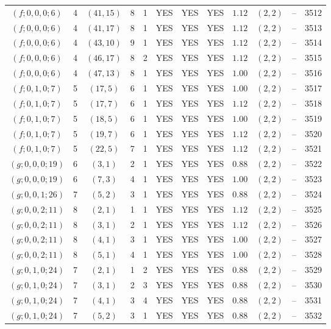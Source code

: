 \begin{longtable}{|c|c|c|c|c|c|c|c|c|c|c|c|}
$(f;0,0,0;6)$ & 4 & $(41,15)$ & 8 & 1 & YES & YES & YES & $1.12$ & $(2,2)$ & -- & 3512\\
$(f;0,0,0;6)$ & 4 & $(41,17)$ & 8 & 1 & YES & YES & YES & $1.12$ & $(2,2)$ & -- & 3513\\
$(f;0,0,0;6)$ & 4 & $(43,10)$ & 9 & 1 & YES & YES & YES & $1.12$ & $(2,2)$ & -- & 3514\\
$(f;0,0,0;6)$ & 4 & $(46,17)$ & 8 & 2 & YES & YES & YES & $1.12$ & $(2,2)$ & -- & 3515\\
$(f;0,0,0;6)$ & 4 & $(47,13)$ & 8 & 1 & YES & YES & YES & $1.00$ & $(2,2)$ & -- & 3516\\
$(f;0,1,0;7)$ & 5 & $(17,5)$ & 6 & 1 & YES & YES & YES & $1.00$ & $(2,2)$ & -- & 3517\\
$(f;0,1,0;7)$ & 5 & $(17,7)$ & 6 & 1 & YES & YES & YES & $1.12$ & $(2,2)$ & -- & 3518\\
$(f;0,1,0;7)$ & 5 & $(18,5)$ & 6 & 1 & YES & YES & YES & $1.00$ & $(2,2)$ & -- & 3519\\
$(f;0,1,0;7)$ & 5 & $(19,7)$ & 6 & 1 & YES & YES & YES & $1.12$ & $(2,2)$ & -- & 3520\\
$(f;0,1,0;7)$ & 5 & $(22,5)$ & 7 & 1 & YES & YES & YES & $1.12$ & $(2,2)$ & -- & 3521\\
$(g;0,0,0;19)$ & 6 & $(3,1)$ & 2 & 1 & YES & YES & YES & $0.88$ & $(2,2)$ & -- & 3522\\
$(g;0,0,0;19)$ & 6 & $(7,3)$ & 4 & 1 & YES & YES & YES & $1.00$ & $(2,2)$ & -- & 3523\\
$(g;0,0,1;26)$ & 7 & $(5,2)$ & 3 & 1 & YES & YES & YES & $0.88$ & $(2,2)$ & -- & 3524\\
$(g;0,0,2;11)$ & 8 & $(2,1)$ & 1 & 1 & YES & YES & YES & $1.12$ & $(2,2)$ & -- & 3525\\
$(g;0,0,2;11)$ & 8 & $(3,1)$ & 2 & 1 & YES & YES & YES & $1.12$ & $(2,2)$ & -- & 3526\\
$(g;0,0,2;11)$ & 8 & $(4,1)$ & 3 & 1 & YES & YES & YES & $1.00$ & $(2,2)$ & -- & 3527\\
$(g;0,0,2;11)$ & 8 & $(5,1)$ & 4 & 1 & YES & YES & YES & $1.00$ & $(2,2)$ & -- & 3528\\
$(g;0,1,0;24)$ & 7 & $(2,1)$ & 1 & 2 & YES & YES & YES & $0.88$ & $(2,2)$ & -- & 3529\\
$(g;0,1,0;24)$ & 7 & $(3,1)$ & 2 & 3 & YES & YES & YES & $0.88$ & $(2,2)$ & -- & 3530\\
$(g;0,1,0;24)$ & 7 & $(4,1)$ & 3 & 4 & YES & YES & YES & $0.88$ & $(2,2)$ & -- & 3531\\
$(g;0,1,0;24)$ & 7 & $(5,2)$ & 3 & 1 & YES & YES & YES & $0.88$ & $(2,2)$ & -- & 3532\\

\end{longtable}
